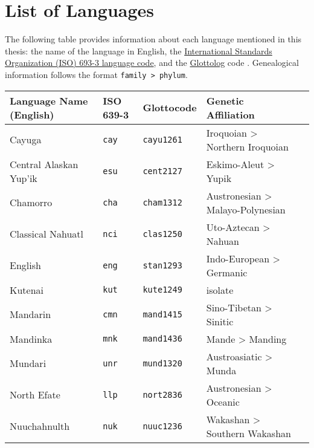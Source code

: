 \chapter*{List of Languages}
\label{ch:languages}

The following table provides information about each language mentioned in this thesis: the name of the language in English, the \href{https://iso639-3.sil.org/}{International Standards Organization (ISO) 693-3 language code}, and the \href{https://glottolog.org/}{Glottolog} code \parencite{HammarstromForkelHaspelmath2019}. Genealogical information follows the format \texttt{family > phylum}.

\renewcommand{\arraystretch}{1}

\begin{table}[h]
  \onehalfspacing
  \begin{tabularx}{\linewidth}{ l l l l l }
    \textbf{Language Name (English)} & \textbf{ISO 639-3} & \textbf{Glottocode} & \textbf{Genetic Affiliation}\\
    \midrule
    Cayuga                           & \texttt{cay}       & \texttt{cayu1261}   & Iroquoian > Northern Iroquoian\\
    Central Alaskan Yup'ik           & \texttt{esu}       & \texttt{cent2127}   & Eskimo-Aleut > Yupik\\
    Chamorro                         & \texttt{cha}       & \texttt{cham1312}   & Austronesian > Malayo-Polynesian\\
    Classical Nahuatl                & \texttt{nci}       & \texttt{clas1250}   & Uto-Aztecan > Nahuan\\
    English                          & \texttt{eng}       & \texttt{stan1293}   & Indo-European > Germanic\\
    Kutenai                          & \texttt{kut}       & \texttt{kute1249}   & isolate\\
    Mandarin                         & \texttt{cmn}       & \texttt{mand1415}   & Sino-Tibetan > Sinitic\\
    Mandinka                         & \texttt{mnk}       & \texttt{mand1436}   & Mande > Manding\\
    Mundari                          & \texttt{unr}       & \texttt{mund1320}   & Austroasiatic > Munda\\
    North Efate                      & \texttt{llp}       & \texttt{nort2836}   & Austronesian > Oceanic\\
    Nuuchahnulth                     & \texttt{nuk}       & \texttt{nuuc1236}   & Wakashan > Southern Wakashan\\

\end{tabularx}
\end{table}

